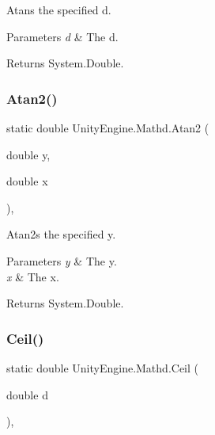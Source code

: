 Atans the specified d. 


\begin{DoxyParams}{Parameters}
{\em d} & The d.\\
\hline
\end{DoxyParams}
\begin{DoxyReturn}{Returns}
System.\+Double.
\end{DoxyReturn}
\mbox{\label{struct_unity_engine_1_1_mathd_a3e5351b317964df9b7f46335da6b1035}} 
\subsubsection{\texorpdfstring{Atan2()}{Atan2()}}
{\footnotesize\ttfamily static double Unity\+Engine.\+Mathd.\+Atan2 (\begin{DoxyParamCaption}\item[{double}]{y,  }\item[{double}]{x }\end{DoxyParamCaption})\hspace{0.3cm}{\ttfamily [inline]}, {\ttfamily [static]}}



Atan2s the specified y. 


\begin{DoxyParams}{Parameters}
{\em y} & The y.\\
\hline
{\em x} & The x.\\
\hline
\end{DoxyParams}
\begin{DoxyReturn}{Returns}
System.\+Double.
\end{DoxyReturn}
\mbox{\label{struct_unity_engine_1_1_mathd_a4dbce6fe361ddc9d8a154d04ae40b022}} 
\subsubsection{\texorpdfstring{Ceil()}{Ceil()}}
{\footnotesize\ttfamily static double Unity\+Engine.\+Mathd.\+Ceil (\begin{DoxyParamCaption}\item[{double}]{d }\end{DoxyParamCaption})\hspace{0.3cm}{\ttfamily [inline]}, {\ttfamily [static]}}



